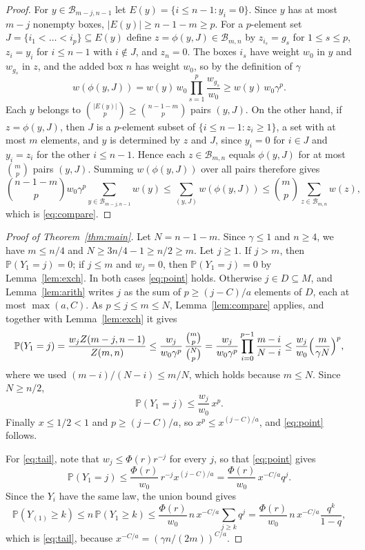 \documentclass[11pt]{amsart}
\theoremstyle{remark}
\numberwithin{equation}{section}
\newcommand{\Pp}{\mathbb P}
\newcommand{\cB}{\mathcal B}
\begin{document}
\begin{proof}
For $y\in\cB_{m-j,n-1}$ let $E(y)=\{i\le n-1:y_i=0\}$. Since $y$ has at most $m-j$ nonempty boxes, $|E(y)|\ge n-1-m\ge p$. For a $p$-element set $J=\{i_1<\dots<i_p\}\subseteq E(y)$ define $z=\phi(y,J)\in\cB_{m,n}$ by $z_{i_s}=g_s$ for $1\le s\le p$, $z_i=y_i$ for $i\le n-1$ with $i\notin J$, and $z_n=0$. The boxes $i_s$ have weight $w_0$ in $y$ and $w_{g_s}$ in $z$, and the added box $n$ has weight $w_0$, so by the definition of $\gamma$
\[
w(\phi(y,J))=w(y)\,w_0\prod_{s=1}^p\frac{w_{g_s}}{w_0}\ge w(y)\,w_0\gamma^p.
\]
Each $y$ belongs to $\binom{|E(y)|}{p}\ge\binom{n-1-m}{p}$ pairs $(y,J)$. On the other hand, if $z=\phi(y,J)$, then $J$ is a $p$-element subset of $\{i\le n-1:z_i\ge1\}$, a set with at most $m$ elements, and $y$ is determined by $z$ and $J$, since $y_i=0$ for $i\in J$ and $y_i=z_i$ for the other $i\le n-1$. Hence each $z\in\cB_{m,n}$ equals $\phi(y,J)$ for at most $\binom mp$ pairs $(y,J)$. Summing $w(\phi(y,J))$ over all pairs therefore gives
\[
\binom{n-1-m}{p}w_0\gamma^p\sum_{y\in\cB_{m-j,n-1}}w(y)\le\sum_{(y,J)}w(\phi(y,J))\le\binom mp\sum_{z\in\cB_{m,n}}w(z),
\]
which is \eqref{eq:compare}.
\end{proof}

\begin{proof}[Proof of Theorem~\ref{thm:main}]
Let $N=n-1-m$. Since $\gamma\le1$ and $n\ge4$, we have $m\le n/4$ and $N\ge3n/4-1\ge n/2\ge m$. Let $j\ge1$. If $j>m$, then $\Pp(Y_1=j)=0$; if $j\le m$ and $w_j=0$, then $\Pp(Y_1=j)=0$ by Lemma~\ref{lem:exch}. In both cases \eqref{eq:point} holds. Otherwise $j\in D\subseteq M$, and Lemma~\ref{lem:arith} writes $j$ as the sum of $p\ge(j-C)/a$ elements of $D$, each at most $\max(a,C)$. As $p\le j\le m\le N$, Lemma~\ref{lem:compare} applies, and together with Lemma~\ref{lem:exch} it gives
\[
\Pp(Y_1=j)=\frac{w_jZ(m-j,n-1)}{Z(m,n)}\le\frac{w_j}{w_0\gamma^p}\,\frac{\binom mp}{\binom Np}=\frac{w_j}{w_0\gamma^p}\prod_{i=0}^{p-1}\frac{m-i}{N-i}\le\frac{w_j}{w_0}\Bigl(\frac{m}{\gamma N}\Bigr)^p,
\]
where we used $(m-i)/(N-i)\le m/N$, which holds because $m\le N$. Since $N\ge n/2$,
\begin{equation}\label{eq:pointp}
\Pp(Y_1=j)\le\frac{w_j}{w_0}\,x^p.
\end{equation}
Finally $x\le1/2<1$ and $p\ge(j-C)/a$, so $x^p\le x^{(j-C)/a}$, and \eqref{eq:point} follows.

For \eqref{eq:tail}, note that $w_j\le\Phi(r)r^{-j}$ for every $j$, so that \eqref{eq:point} gives
\[
\Pp(Y_1=j)\le\frac{\Phi(r)}{w_0}\,r^{-j}x^{(j-C)/a}=\frac{\Phi(r)}{w_0}\,x^{-C/a}q^j .
\]
Since the $Y_i$ have the same law, the union bound gives
\[
\Pp(Y_{(1)}\ge k)\le n\,\Pp(Y_1\ge k)\le\frac{\Phi(r)}{w_0}\,n\,x^{-C/a}\sum_{j\ge k}q^j=\frac{\Phi(r)}{w_0}\,n\,x^{-C/a}\frac{q^k}{1-q},
\]
which is \eqref{eq:tail}, because $x^{-C/a}=(\gamma n/(2m))^{C/a}$.
\end{proof}
\end{document}
